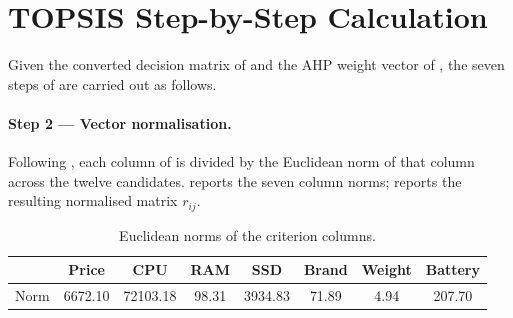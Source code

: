 \section{TOPSIS Step-by-Step Calculation}\label{app:laptop-data-topsis}

Given the converted decision matrix of  and the AHP
weight vector of , the seven steps of 
are carried out as follows.

\paragraph{Step 2 --- Vector normalisation.}
Following , each column of  is divided by
the Euclidean norm of that column across the twelve candidates. 
reports the seven column norms;  reports the resulting
normalised matrix $r_{ij}$.

\begin{table}[htbp]
  \centering
  \caption{Euclidean norms of the criterion columns.}
  \label{tab:topsis-norms}
  \begin{tabular}{@{}lccccccc@{}}
    \toprule
     & \textbf{Price} & \textbf{CPU} & \textbf{RAM} & \textbf{SSD} & \textbf{Brand} & \textbf{Weight} & \textbf{Battery} \\
    \midrule
    Norm & 6672.10 & 72103.18 & 98.31 & 3934.83 & 71.89 & 4.94 & 207.70 \\
    \bottomrule
  \end{tabular}
\end{table}

